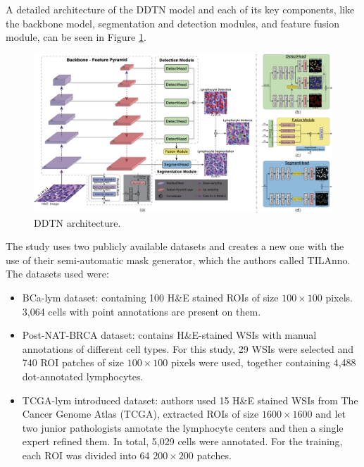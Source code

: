 A detailed architecture of the DDTN model and each of its key components, like the backbone model, segmentation and detection modules, and feature fusion module, can be seen in Figure \ref{fig:rw-ddtn-arch}.

\begin{figure}[H]
    \begin{centering}
    \includegraphics[width=14cm]{assets/images/rw-ddtn-architecture.jpg}
    \par\end{centering}
    \caption{DDTN architecture.}
    \label{fig:rw-ddtn-arch}
\end{figure}

The study uses two publicly available datasets and creates a new one with the use of their semi-automatic mask generator, which the authors called TILAnno. The datasets used were:

\begin{itemize}
    \item BCa-lym dataset: containing 100 H\&E stained ROIs of size $100\!\times\!100$ pixels. 3,064 cells with point annotations are present on them.
    \item Post-NAT-BRCA dataset: contains H\&E-stained WSIs with manual annotations of different cell types. For this study, 29 WSIs were selected and 740 ROI patches of size $100\!\times\!100$ pixels were used, together containing 4,488 dot-annotated lymphocytes.
    \item TCGA-lym introduced dataset: authors used 15 H\&E stained WSIs from The Cancer Genome Atlas (TCGA), extracted ROIs of size $1600\!\times\!1600$ and let two junior pathologists annotate the lymphocyte centers and then a single expert refined them. In total, 5,029 cells were annotated. For the training, each ROI was divided into 64 $200\!\times\!200$ patches.
\end{itemize}

